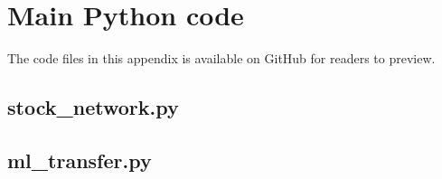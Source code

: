 \chapter{Main Python code}

The code files in this appendix is available on GitHub for readers to preview.

\section{stock\_network.py}
\label{sec:inp-eg}
%

%
{\fontsize{6pt}{6pt}\selectfont 

}

\section{ml\_transfer.py}
{\fontsize{6pt}{6pt}\selectfont 
	
}

